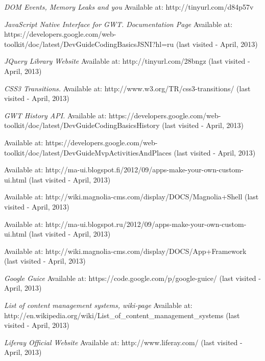 \begin{thebibliography}{9}
\emph{DOM Events, Memory Leaks and you} 
Available at: http://tinyurl.com/d84p57v 
  
\emph{JavaScript Native Interface for GWT. Documentation Page} 
Available at: https://developers.google.com/web-toolkit/doc/latest/DevGuideCodingBasicsJSNI?hl=ru (last visited - April, 2013)

\emph{JQuery Library Website} 
Available at: http://tinyurl.com/28bngz (last visited - April, 2013)

\emph{CSS3 Transitions.} 
Available at: http://www.w3.org/TR/css3-transitions/ (last visited - April, 2013)

\emph{GWT History API.} 
Available at: https://developers.google.com/web-toolkit/doc/latest/DevGuideCodingBasicsHistory (last visited - April, 2013)

Available at: https://developers.google.com/web-toolkit/doc/latest/DevGuideMvpActivitiesAndPlaces (last visited - April, 2013)

Available at: http://ma-ui.blogspot.fi/2012/09/apps-make-your-own-custom-ui.html (last visited - April, 2013)

Available at: http://wiki.magnolia-cms.com/display/DOCS/Magnolia+Shell (last visited - April, 2013)

Available at: http://ma-ui.blogspot.ru/2012/09/apps-make-your-own-custom-ui.html (last visited - April, 2013)

Available at: http://wiki.magnolia-cms.com/display/DOCS/App+Framework (last visited - April, 2013)

\emph{Google Guice} 
Available at: https://code.google.com/p/google-guice/ (last visited - April, 2013)

\emph{List of content management systems, wiki-page}
Available at: http://en.wikipedia.org/wiki/List_of_content_management_systems (last visited - April, 2013)

\emph{Liferay Official Website}
Available at: http://www.liferay.com/ (last visited - April, 2013)
\end{thebibliography}